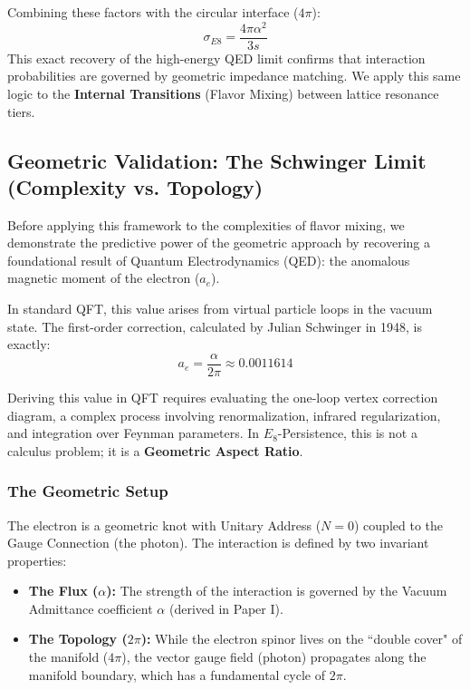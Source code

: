 Combining these factors with the circular interface ($4\pi$):
\begin{equation}
\sigma_{E8} = \frac{4\pi \alpha^2}{3s}
\end{equation}
This exact recovery of the high-energy QED limit confirms that interaction probabilities are governed by geometric impedance matching. We apply this same logic to the \textbf{Internal Transitions} (Flavor Mixing) between lattice resonance tiers.

\subsection{Geometric Validation: The Schwinger Limit (Complexity vs. Topology)}

Before applying this framework to the complexities of flavor mixing, we demonstrate the predictive power of the geometric approach by recovering a foundational result of Quantum Electrodynamics (QED): the anomalous magnetic moment of the electron ($a_e$).

In standard QFT, this value arises from virtual particle loops in the vacuum state. The first-order correction, calculated by Julian Schwinger in 1948, is exactly:
\begin{equation}
a_e = \frac{\alpha}{2\pi} \approx 0.0011614
\end{equation}

Deriving this value in QFT requires evaluating the one-loop vertex correction diagram, a complex process involving renormalization, infrared regularization, and integration over Feynman parameters. In $E_8$-Persistence, this is not a calculus problem; it is a \textbf{Geometric Aspect Ratio}.

\subsubsection{The Geometric Setup}

The electron is a geometric knot with Unitary Address ($N=0$) coupled to the Gauge Connection (the photon). The interaction is defined by two invariant properties:

\begin{itemize}
    \item \textbf{The Flux ($\alpha$):} The strength of the interaction is governed by the Vacuum Admittance coefficient $\alpha$ (derived in Paper I).
    \item \textbf{The Topology ($2\pi$):} While the electron spinor lives on the ``double cover" of the manifold ($4\pi$), the vector gauge field (photon) propagates along the manifold boundary, which has a fundamental cycle of $2\pi$.
\end{itemize}

